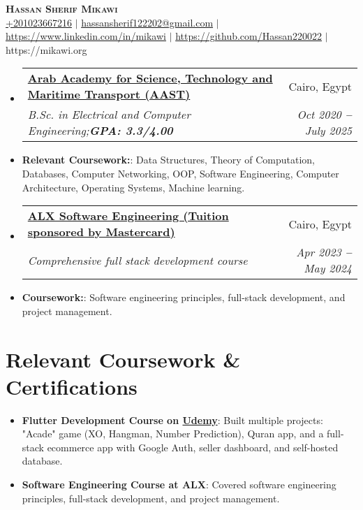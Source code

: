 \documentclass[letterpaper,10.5pt]{article}
\makeatletter
\newcommand{\resumeItem}[2]{
  \item\small{
    \textbf{#1}{: #2 \vspace{-2pt}}
  }
}
\newcommand{\resumeSubheading}[4]{
  \vspace{-2pt}\item
    \begin{tabular*}{0.97\textwidth}[t]{l@{\extracolsep{\fill}}r}
      \textbf{#1} & #2 \\
      \textit{\small#3} & \textit{\small #4} \\
    \end{tabular*}\vspace{-7pt}
}
\newcommand{\resumeSubItem}[2]{\resumeItem{#1}{#2}\vspace{-4pt}}
\newcommand{\resumeSubHeadingListStart}{\begin{itemize}[leftmargin=0.15in, label={}]}
\newcommand{\resumeSubHeadingListEnd}{\end{itemize}}
\newcommand{\resumeItemListStart}{\begin{itemize}}
\newcommand{\resumeItemListEnd}{\end{itemize}\vspace{-5pt}}
\makeatother
\begin{document}

\begin{center}
    \textbf{\Huge \scshape Hassan Sherif Mikawi} \\ \vspace{5pt}
    \small
    \hspace{.5pt} \href{tel:+201023667216}{+201023667216}
    $|$
    \hspace{.5pt} \href{mailto:hassansherif122202@gmail.com}{hassansherif122202@gmail.com}
    $|$
    \hspace{.5pt} \href{https://www.linkedin.com/in/mikawi}{https://www.linkedin.com/in/mikawi}
    $|$
    \hspace{.5pt} \href{https://github.com/Hassan220022}{https://github.com/Hassan220022}
    $|$
    https://mikawi.org
\end{center}



\resumeSubHeadingListStart
  \resumeSubheading
    {\href{https://aast.edu/en/index.php?from=edurank.org}{Arab Academy for Science, Technology and Maritime Transport (AAST)}}{Cairo, Egypt}
    {B.Sc. in Electrical and Computer Engineering;\textbf{GPA: 3.3/4.00}}{Oct 2020 \textbf{--} July 2025}
    {}{}
    \resumeSubItem
      {Relevant Coursework:}
      {Data Structures, Theory of Computation, Databases, Computer Networking, OOP, Software Engineering, Computer Architecture, Operating Systems, Machine learning.}
\resumeSubHeadingListEnd

\resumeSubHeadingListStart
  \resumeSubheading
    {\href{https://tech.alxafrica.com/hubfs/ALX-Software-Engineering-Curriculum.pdf?hsLang=en}{ALX Software Engineering (Tuition sponsored by Mastercard)}}{Cairo, Egypt}
    {Comprehensive full stack development course}{Apr 2023 \textbf{--} May 2024}
    {}{}
    \resumeSubItem
      {Coursework:}
      {Software engineering principles, full-stack development, and project management.}
\resumeSubHeadingListEnd


\section{Relevant Coursework \& Certifications}
\resumeItemListStart
  \resumeItem
    {Flutter Development Course on \href{https://www.udemy.com/share/101rfI3@KrQXcIQfUCfZKdb0xVqKLKdnx6689mXcLDpKdRQCCB3qYZEyTs9KuzFftgd7fqvAJA==/}{Udemy}}
    {Built multiple projects: "Acade" game (XO, Hangman, Number Prediction), Quran app, and a full-stack ecommerce app with Google Auth, seller dashboard, and self-hosted database.}
  \resumeItem
    {Software Engineering Course at ALX}
    {Covered software engineering principles, full-stack development, and project management.}
\resumeItemListEnd
\end{document}
